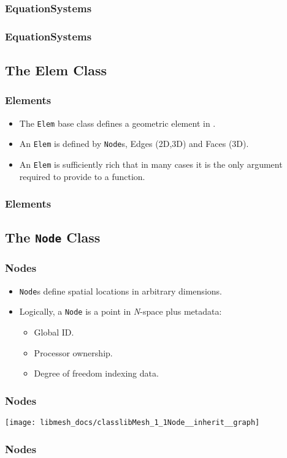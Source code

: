 \begin{frame}[shrink]
  \frametitle{EquationSystems}
  
\end{frame}

\begin{frame}[shrink]
  \frametitle{EquationSystems}
  
\end{frame}
 



\subsection{The Elem Class}
\begin{frame}
  \frametitle{Elements}
  \begin{block}{}
    \begin{itemize}
      \item The \texttt{Elem} base class defines a geometric element in \libMesh{}.
      \item An \texttt{Elem} is defined by \texttt{Node}s, Edges (2D,3D) and Faces (3D).
      \item An \texttt{Elem} is sufficiently rich that in many cases it is the only argument required to provide to a function.
    \end{itemize}
  \end{block}
\end{frame}

\begin{frame}[shrink]
  \frametitle{Elements}
  
\end{frame}

 

\subsection{The \texttt{Node} Class}
\begin{frame}
  \frametitle{Nodes}
  \begin{block}{}
    \begin{itemize}
      \item \texttt{Node}s define spatial locations in arbitrary dimensions.
      \item Logically, a \texttt{Node} is a point in \emph{N}-space plus metadata:
        \begin{itemize}
          \item Global ID.
          \item Processor ownership.
          \item Degree of freedom indexing data.
        \end{itemize}
    \end{itemize}
  \end{block}
\end{frame}

\begin{frame}
  \frametitle{Nodes}
  \begin{center}
    \texttt{[image: libmesh\_docs/classlibMesh\_1\_1Node\_\_inherit\_\_graph]}
  \end{center}
\end{frame}

\begin{frame}
  \frametitle{Nodes}
  
\end{frame}

